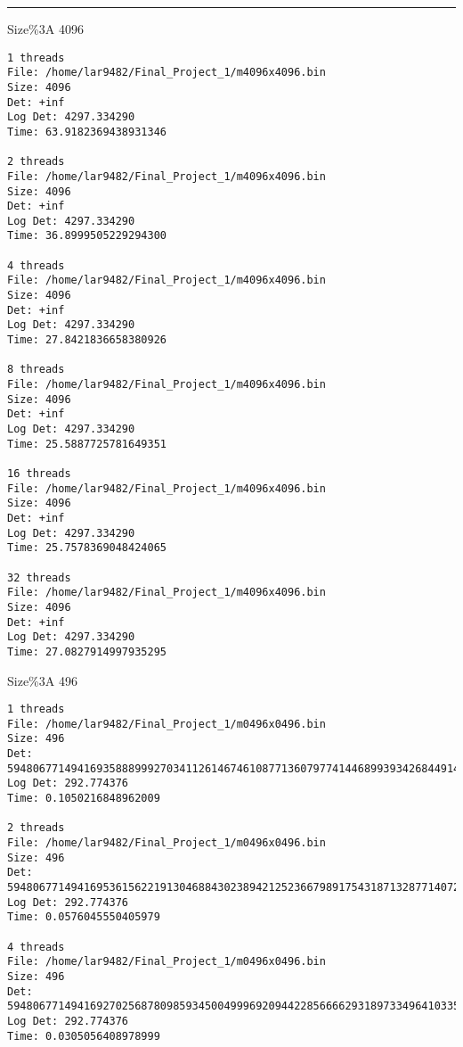 \documentclass[letter, 12pt]{article}
\newenvironment{question}[1]{%
    \vspace{.2in}%
        \noindent{\bf #1}%
    \vspace{0.3em} \hrule \vspace{.1in}%
}{}
\begin{document}
\begin{question}{\large Appendix}
Size\%3A 4096
\begin{lstlisting}[style=CStyle]
1 threads
File: /home/lar9482/Final_Project_1/m4096x4096.bin
Size: 4096
Det: +inf
Log Det: 4297.334290
Time: 63.9182369438931346

2 threads
File: /home/lar9482/Final_Project_1/m4096x4096.bin
Size: 4096
Det: +inf
Log Det: 4297.334290
Time: 36.8999505229294300

4 threads
File: /home/lar9482/Final_Project_1/m4096x4096.bin
Size: 4096
Det: +inf
Log Det: 4297.334290
Time: 27.8421836658380926

8 threads
File: /home/lar9482/Final_Project_1/m4096x4096.bin
Size: 4096
Det: +inf
Log Det: 4297.334290
Time: 25.5887725781649351

16 threads
File: /home/lar9482/Final_Project_1/m4096x4096.bin
Size: 4096
Det: +inf
Log Det: 4297.334290
Time: 25.7578369048424065

32 threads
File: /home/lar9482/Final_Project_1/m4096x4096.bin
Size: 4096
Det: +inf
Log Det: 4297.334290
Time: 27.0827914997935295
\end{lstlisting}

Size\%3A 496
\begin{lstlisting}[style=CStyle]
1 threads
File: /home/lar9482/Final_Project_1/m0496x0496.bin
Size: 496
Det: 59480677149416935888999270341126146746108771360797741446899393426844914293146145328142476117969496836558481476151373701081839789310738822024594197493929536328210362858112381475986270725213708483715180043365785500181353528915190580132943971730815399755346890097922034330115138426489324380880896.000000
Log Det: 292.774376
Time: 0.1050216848962009

2 threads
File: /home/lar9482/Final_Project_1/m0496x0496.bin
Size: 496
Det: 59480677149416953615622191304688430238942125236679891754318713287714072272299055035458125632219936780448033785144124224156988731697521592832161383192745213384887479042282934957217488675317872877693416173814804815891370999649753526306477254939186659410094618787331326217936162536137943362306048.000000
Log Det: 292.774376
Time: 0.0576045550405979

4 threads
File: /home/lar9482/Final_Project_1/m0496x0496.bin
Size: 496
Det: 59480677149416927025687809859345004999692094422856666293189733496410335303569690474484651360844276864613705321654998439544265318117347436620810604644521697799871804766027104735370661750161626286726061978141275842326344793547909107046177330126629769927973025753217388386204626371665014890168320.000000
Log Det: 292.774376
Time: 0.0305056408978999


\end{lstlisting}
\end{question}
\end{document}
